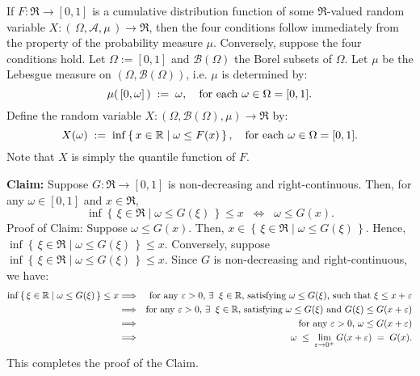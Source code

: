 \proof
If $F : \Re \longrightarrow [0,1]$ is a cumulative distribution function of some
$\Re$-valued random variable $X : \left(\,\Omega,\mathcal{A},\mu\,\right) \longrightarrow \Re$,
then the four conditions follow immediately from the property of the probability measure $\mu$.
Conversely, suppose the four conditions hold. Let $\Omega := [0,1]$ and $\mathcal{B}(\Omega)$ the Borel subsets of $\Omega$.
Let $\mu$ be the Lebesgue measure on $(\Omega,\mathcal{B}(\Omega))$, i.e. $\mu$ is determined by:
\begin{equation*}
\mu\!\left(\,[0,\omega]\,\right) \; := \; \omega,
\quad
\textnormal{for each $\omega \in \Omega = [0,1]$}.
\end{equation*}
Define the random variable $X : (\Omega,\mathcal{B}(\Omega),\mu) \longrightarrow \Re$ by:
\begin{equation*}
X(\omega) \; := \; \inf \left\{\,x \in \Re \;\vert\; \omega \leq F(x)\,\right\},
\quad
\textnormal{for each $\omega \in \Omega = [0,1]$}.
\end{equation*}
Note that $X$ is simply the quantile function of $F$.
\vskip 0.2cm
\begin{center}
\begin{minipage}{6in}
\noindent
\textbf{Claim:}\;\; Suppose $G : \Re \longrightarrow [0,1]$ is non-decreasing and right-continuous.
Then, for any $\omega \in [0,1]$ and $x \in \Re$,
\begin{equation*}
\inf\left\{\,\xi \in \Re \;\vert\; \omega \leq G(\xi) \,\right\} \leq x
\;\; \Longleftrightarrow \;\;
\omega \leq G(x).
\end{equation*}
Proof of Claim:\;\; Suppose $\omega \leq G(x)$.
Then, $x \in \left\{\,\xi \in \Re \;\vert\; \omega \leq G(\xi) \,\right\}$.
Hence, $\inf\left\{\,\xi \in \Re \;\vert\; \omega \leq G(\xi) \,\right\} \leq x$.
Conversely, suppose $\inf\left\{\,\xi \in \Re \;\vert\; \omega \leq G(\xi) \,\right\} \leq x$.
Since $G$ is non-decreasing and right-continuous, we have:
\begin{eqnarray*}
\inf\left\{\,\xi \in \Re \;\vert\; \omega \leq G(\xi) \,\right\} \leq x
&\Longrightarrow&
\textnormal{for any $\varepsilon > 0$, $\exists \;\; \xi \in \Re$, satisfying $\omega \leq G(\xi)$, such that $\xi \leq x + \varepsilon$}
\\
&\Longrightarrow&
\textnormal{for any $\varepsilon > 0$, $\exists \;\; \xi \in \Re$, satisfying $\omega \leq G(\xi)$ and $G(\xi) \leq G(x + \varepsilon)$}
\\
&\Longrightarrow&
\textnormal{for any $\varepsilon > 0$, $\omega \leq G(x + \varepsilon)$}
\\
&\Longrightarrow&
\omega \;\leq\; \lim_{\varepsilon\rightarrow 0^{+}}G(x + \varepsilon) \;=\; G(x).
\end{eqnarray*}
This completes the proof of the Claim.
\end{minipage}
\end{center}
